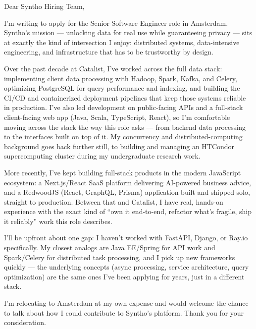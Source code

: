\documentclass[11pt, letterpaper]{article}
\begin{document}
\coverletterheader
\coverletterdate

Dear Syntho Hiring Team,

I'm writing to apply for the Senior Software Engineer role in Amsterdam. Syntho's mission --- unlocking data for
real use while guaranteeing privacy --- sits at exactly the kind of intersection I enjoy: distributed systems,
data-intensive engineering, and infrastructure that has to be trustworthy by design.

Over the past decade at Catalist, I've worked across the full data stack: implementing client data processing with
Hadoop, Spark, Kafka, and Celery, optimizing PostgreSQL for query performance and indexing, and building the CI/CD
and containerized deployment pipelines that keep those systems reliable in production. I've also led development
on public-facing APIs and a full-stack client-facing web app (Java, Scala, TypeScript, React), so I'm comfortable
moving across the stack the way this role asks --- from backend data processing to the interfaces built on top of
it. My concurrency and distributed-computing background goes back further still, to building and managing an
HTCondor supercomputing cluster during my undergraduate research work.

More recently, I've kept building full-stack products in the modern JavaScript ecosystem: a Next.js/React SaaS
platform delivering AI-powered business advice, and a RedwoodJS (React, GraphQL, Prisma) application built and
shipped solo, straight to production. Between that and Catalist, I have real, hands-on experience with the exact
kind of ``own it end-to-end, refactor what's fragile, ship it reliably'' work this role describes.

I'll be upfront about one gap: I haven't worked with FastAPI, Django, or Ray.io specifically. My closest analogs
are Java EE/Spring for API work and Spark/Celery for distributed task processing, and I pick up new frameworks
quickly --- the underlying concepts (async processing, service architecture, query optimization) are the same
ones I've been applying for years, just in a different stack.

I'm relocating to Amsterdam at my own expense and would welcome the chance to talk about how I could contribute
to Syntho's platform. Thank you for your consideration.

\end{document}
